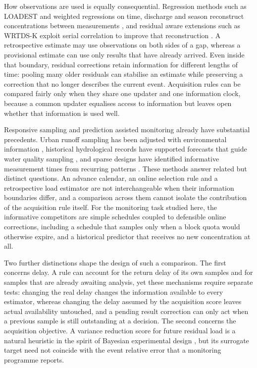 \documentclass[lineno,pdflatex,sn-apa]{sn-jnl}%
\theoremstyle{thmstyleone}%
\theoremstyle{thmstyletwo}%
\theoremstyle{thmstylethree}%
\begin{document}
How observations are used is equally consequential. Regression methods such as LOADEST and weighted regressions on time, discharge and season reconstruct concentrations between measurements \citep{runkel2004,hirsch2010}, and residual aware extensions such as WRTDS-K exploit serial correlation to improve that reconstruction \citep{zhang2019}. A retrospective estimate may use observations on both sides of a gap, whereas a provisional estimate can use only results that have already arrived. Even inside that boundary, residual corrections retain information for different lengths of time: pooling many older residuals can stabilise an estimate while preserving a correction that no longer describes the current event. Acquisition rules can be compared fairly only when they share one updater and one information clock, because a common updater equalises access to information but leaves open whether that information is used well.

Responsive sampling and prediction assisted monitoring already have substantial precedents. Urban runoff sampling has been adjusted with environmental information \citep{wong2016}, historical hydrological records have supported forecasts that guide water quality sampling \citep{wilson2026}, and sparse designs have identified informative measurement times from recurring patterns \citep{manohar2018,binmamoon2025}. These methods answer related but distinct questions. An advance calendar, an online selection rule and a retrospective load estimator are not interchangeable when their information boundaries differ, and a comparison across them cannot isolate the contribution of the acquisition rule itself. For the monitoring task studied here, the informative competitors are simple schedules coupled to defensible online corrections, including a schedule that samples only when a block quota would otherwise expire, and a historical predictor that receives no new concentration at all.

Two further distinctions shape the design of such a comparison. The first concerns delay. A rule can account for the return delay of its own samples and for samples that are already awaiting analysis, yet these mechanisms require separate tests: changing the real delay changes the information available to every estimator, whereas changing the delay assumed by the acquisition score leaves actual availability untouched, and a pending result correction can only act when a previous sample is still outstanding at a decision. The second concerns the acquisition objective. A variance reduction score for future residual load is a natural heuristic in the spirit of Bayesian experimental design \citep{chaloner1995}, but its surrogate target need not coincide with the event relative error that a monitoring programme reports.
\end{document}

